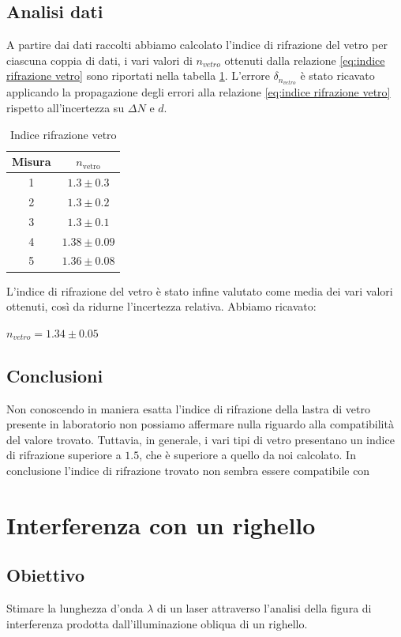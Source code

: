 \documentclass[a4paper]{article}
\begin{document}
\subsection{Analisi dati}
A partire dai dati raccolti abbiamo calcolato l'indice di rifrazione del vetro per ciascuna coppia di dati, i vari valori di $n_{vetro}$ ottenuti dalla relazione \ref{eq:indice rifrazione vetro} sono riportati nella tabella \ref{tab:indice_rifrazione_vetro}. L'errore $\delta_{n_{vetro}}$ è stato ricavato applicando la propagazione degli errori alla relazione \ref{eq:indice rifrazione vetro} rispetto all'incertezza su $\Delta N$ e $d$.
\begin{table}[h!]
\centering
\begin{tabular}{|c|c|}
\hline
\textbf{Misura} & \( n_{\text{vetro}} \) \\
\hline
1 & \( 1.3 \pm 0.3 \) \\
2 & \( 1.3 \pm 0.2 \) \\
3 & \( 1.3 \pm 0.1 \) \\
4 & \( 1.38 \pm 0.09 \) \\
5 & \( 1.36 \pm 0.08 \) \\
\hline
\end{tabular}
\caption{Indice rifrazione vetro}
\label{tab:indice_rifrazione_vetro}
\end{table}
L'indice di rifrazione del vetro è stato infine valutato come media dei vari valori ottenuti, così da ridurne l'incertezza relativa. Abbiamo ricavato:
\begin{center}
    $n_{vetro}=1.34 \pm 0.05$
\end{center}
\subsection{Conclusioni}
Non conoscendo in maniera esatta l'indice di rifrazione della lastra di vetro presente in laboratorio non possiamo affermare nulla riguardo alla compatibilità del valore trovato. Tuttavia, in generale, i vari tipi di vetro presentano un indice di rifrazione superiore a $1.5$, che è superiore a quello da noi calcolato. In conclusione l'indice di rifrazione trovato non sembra essere compatibile con 

\section{Interferenza con un righello}
\subsection{Obiettivo}
Stimare la lunghezza d'onda $\lambda$ di un laser attraverso l'analisi della figura di interferenza prodotta dall'illuminazione obliqua di un righello. 
\end{document}
